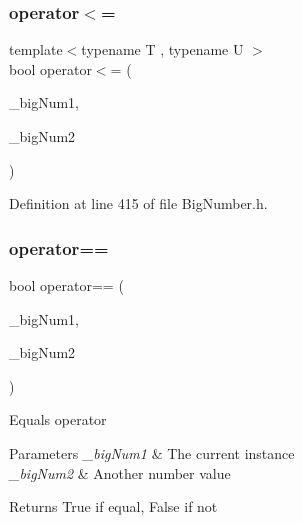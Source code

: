 \subsubsection{\texorpdfstring{operator$<$=}{operator<=}\hspace{0.1cm}{\footnotesize\ttfamily [2/2]}}
{\footnotesize\ttfamily template$<$typename T , typename U $>$ \\
bool operator$<$= (\begin{DoxyParamCaption}\item[{T}]{\+\_\+big\+Num1,  }\item[{const U \&}]{\+\_\+big\+Num2 }\end{DoxyParamCaption})\hspace{0.3cm}{\ttfamily [friend]}}



Definition at line 415 of file Big\+Number.\+h.

\mbox{\label{class_big_nums_1_1_big_number_a895aa35eca34f84db8c543f23274040a}} 
\subsubsection{\texorpdfstring{operator==}{operator==}\hspace{0.1cm}{\footnotesize\ttfamily [1/2]}}
{\footnotesize\ttfamily bool operator== (\begin{DoxyParamCaption}\item[{const \mbox{\hyperlink{class_big_nums_1_1_big_number}{Big\+Number}} \&}]{\+\_\+big\+Num1,  }\item[{const \mbox{\hyperlink{class_big_nums_1_1_big_number}{Big\+Number}} \&}]{\+\_\+big\+Num2 }\end{DoxyParamCaption})\hspace{0.3cm}{\ttfamily [friend]}}

Equals operator 
\begin{DoxyParams}{Parameters}
{\em \+\_\+big\+Num1} & The current instance \\
\hline
{\em \+\_\+big\+Num2} & Another number value \\
\hline
\end{DoxyParams}
\begin{DoxyReturn}{Returns}
True if equal, False if not 
\end{DoxyReturn}


